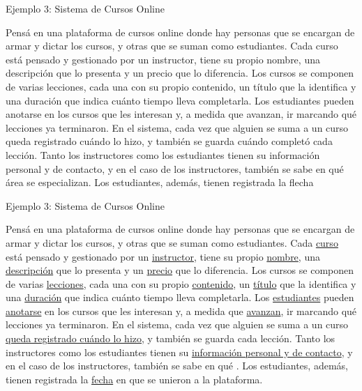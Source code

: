 \documentclass{beamer}
\begin{document}
\begin{frame}{Ejemplo 3: Sistema de Cursos Online}
    \begin{center}
        Pensá en una plataforma de cursos online donde hay personas que se encargan de armar y dictar los cursos, y otras que se suman como estudiantes. Cada curso está pensado y gestionado por un instructor, tiene su propio nombre, una descripción que lo presenta y un precio que lo diferencia. Los cursos se componen de varias lecciones, cada una con su propio contenido, un título que la identifica y una duración que indica cuánto tiempo lleva completarla. Los estudiantes pueden anotarse en los cursos que les interesan y, a medida que avanzan, ir marcando qué lecciones ya terminaron. En el sistema, cada vez que alguien se suma a un curso queda registrado cuándo lo hizo, y también se guarda cuándo completó cada lección. Tanto los instructores como los estudiantes tienen su información personal y de contacto, y en el caso de los instructores, también se sabe en qué área se especializan. Los estudiantes, además, tienen registrada la flecha
        \small
    \end{center}
\end{frame}

\begin{frame}{Ejemplo 3: Sistema de Cursos Online}
    \begin{center}
        Pensá en una plataforma de cursos online donde hay personas que se encargan de armar y dictar los cursos, y otras que se suman como estudiantes. Cada \ul{curso} está pensado y gestionado por un \ul{instructor}, tiene su propio \ul{nombre}, una \ul{descripción} que lo presenta y un \ul{precio} que lo diferencia. Los cursos se componen de varias \ul{lecciones}, cada una con su propio \ul{contenido}, un \ul{título} que la identifica y una \ul{duración} que indica cuánto tiempo lleva completarla. Los \ul{estudiantes} pueden \ul{anotarse} en los cursos que les interesan y, a medida que \ul{avanzan}, ir marcando qué lecciones ya terminaron. En el sistema, cada vez que alguien se suma a un curso \ul{queda registrado cuándo lo hizo}, y también se guarda  cada lección. Tanto los instructores como los estudiantes tienen su \ul{información personal y de contacto}, y en el caso de los instructores, también se sabe en qué . Los estudiantes, además, tienen registrada la \ul{fecha} en que se unieron a la plataforma.
        \small
    \end{center}
\end{frame}
\end{document}
